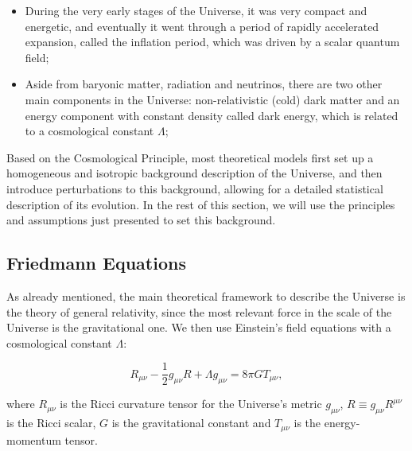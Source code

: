 \documentclass[openany,a4paper,12pt,oneside]{book}
\begin{document}
\begin{spacing}{1.5}
\begin{itemize}
    \item During the very early stages of the Universe, it was very compact and energetic, and eventually it went through a period of rapidly accelerated expansion, called the inflation period, which was driven by a scalar quantum field;
    \item Aside from baryonic matter, radiation and neutrinos, there are two other main components in the Universe: non-relativistic (cold) dark matter and an energy component with constant density called dark energy, which is related to a cosmological constant $\Lambda$;
\end{itemize}


Based on the Cosmological Principle, most theoretical models first set up a homogeneous and isotropic background description of the Universe, and then introduce perturbations to this background, allowing for a detailed statistical description of its evolution. In the rest of this section, we will use the principles and assumptions just presented to set this background.

\subsection{Friedmann Equations}

As already mentioned, the main theoretical framework to describe the Universe is the theory of general relativity, since the most relevant force in the scale of the Universe is the gravitational one. We then use Einstein's field equations with a cosmological constant $\Lambda$:

\begin{equation}\label{field_eqs}
    R_{\mu\nu}-\frac{1}{2}g_{\mu\nu}R+\Lambda g_{\mu\nu}=8\pi GT_{\mu\nu},
\end{equation}

\noindent where $R_{\mu\nu}$ is the Ricci curvature tensor for the Universe's metric $g_{\mu\nu}$, $R\equiv g_{\mu\nu} R^{\mu\nu}$ is the Ricci scalar, $G$ is the gravitational constant and $T_{\mu\nu}$ is the energy-momentum tensor. 


\end{spacing}
\end{document}
